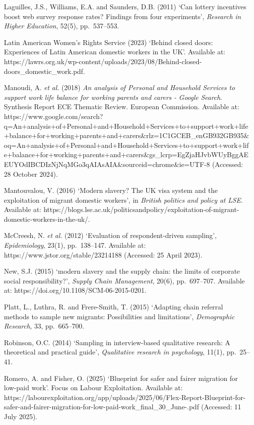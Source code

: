 \documentclass[
  12pt,
  letterpaper,
  DIV=11,
  numbers=noendperiod]{scrartcl}
\begin{document}
Laguilles, J.S., Williams, E.A. and Saunders, D.B. (2011) `Can lottery
incentives boost web survey response rates? Findings from four
experiments', \emph{Research in Higher Education}, 52(5), pp.~537--553.

Latin American Women's Rights Service (2023) `Behind closed doors:
Experiences of Latin American domestic workers in the UK'. Available at:
https://lawrs.org.uk/wp-content/uploads/2023/08/Behind-closed-doors\_domestic\_work.pdf.

Manoudi, A. \emph{et al.} (2018) \emph{An analysis of Personal and
Household Services to support work life balance for working parents and
carers - Google Search}. Synthesis Report ECE Thematic Review. European
Commission. Available at:
https://www.google.com/search?q=An+analysis+of+Personal+and+Household+Services+to+support+work+life+balance+for+working+parents+and+carers\&rlz=1C1GCEB\_enGB932GB935\&oq=An+analysis+of+Personal+and+Household+Services+to+support+work+life+balance+for+working+parents+and+carers\&gs\_lcrp=EgZjaHJvbWUyBggAEEUYOdIBCDIzNjNqMGo3qAIAsAIA\&sourceid=chrome\&ie=UTF-8
(Accessed: 28 October 2024).

Mantouvalou, V. (2016) `Modern slavery? The UK visa system and the
exploitation of migrant domestic workers', in \emph{British politics and
policy at LSE}. Available at:
https://blogs.lse.ac.uk/politicsandpolicy/exploitation-of-migrant-domestic-workers-in-the-uk/.

McCreesh, N. \emph{et al.} (2012) `Evaluation of respondent-driven
sampling', \emph{Epidemiology}, 23(1), pp.~138--147. Available at:
https://www.jstor.org/stable/23214188 (Accessed: 25 April 2023).

New, S.J. (2015) `modern slavery and the supply chain: the limits of
corporate social responsibility?', \emph{Supply Chain Management},
20(6), pp.~697--707. Available at:
https://doi.org/10.1108/SCM-06-2015-0201.

Platt, L., Luthra, R. and Frere-Smith, T. (2015) `Adapting chain
referral methods to sample new migrants: Possibilities and limitations',
\emph{Demographic Research}, 33, pp.~665--700.

Robinson, O.C. (2014) `Sampling in interview-based qualitative research:
A theoretical and practical guide', \emph{Qualitative research in
psychology}, 11(1), pp.~25--41.

Romero, A. and Fisher, O. (2025) `Blueprint for safer and fairer
migration for low-paid work'. Focus on Labour Exploitation. Available
at:
https://labourexploitation.org/app/uploads/2025/06/Flex-Report-Blueprint-for-safer-and-fairer-migration-for-low-paid-work\_final\_30\_June-.pdf
(Accessed: 11 July 2025).
\end{document}
